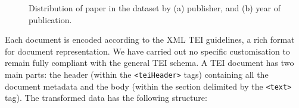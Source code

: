\begin{figure}[htbp]
\centering
{} 
\hspace{5pt} 
\caption{Distribution of paper in the dataset by (a) publisher, and (b) year of publication.} 
\label{fig:dataset-distributions}
\end{figure}

Each document is encoded according to the XML TEI guidelines, a rich format for document representation. 
We have carried out no specific customisation to remain fully compliant with the general TEI schema.
A TEI document has two main parts: the header (within the \texttt{<teiHeader>} tags) containing all the document metadata and the body (within the section delimited by the \texttt{<text>} tag). 
The transformed data has the following structure: 


